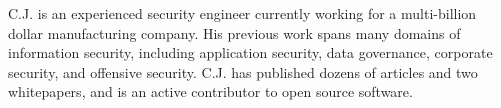 C.J. is an experienced security engineer currently working for a multi-billion dollar manufacturing company. His previous work spans many domains of information security, including application security, data governance, corporate security, and offensive security. C.J. has published dozens of articles and two whitepapers, and is an active contributor to open source software.